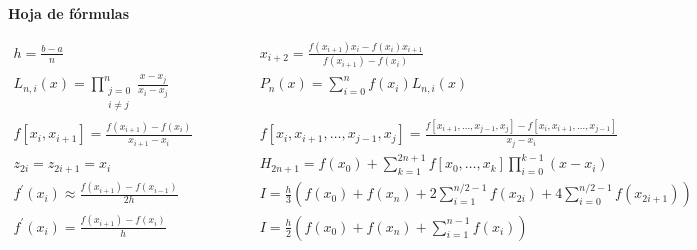 \documentclass[12pt]{article}
\begin{document}
\begin{center}
\textbf{Hoja de fórmulas}
\end{center}
{\large
\[
\begin{array}{cc}
h = \frac{b - a}{n} \qquad & \qquad
x_{i+2} = \frac{f(x_{i+1}){x_i}-f(x_{i}){x_{i+1}}}{f(x_{i+1}) - f(x_i)} \\
L_{n, i}(x) = \prod\limits_{\substack{j=0\\ i \neq j}}^n \frac{x - x_j}{x_i - x_j} \qquad & \qquad
P_n(x) = \sum\limits_{i = 0}^n f(x_i)L_{n,i}(x) \\
f\left[x_i, x_{i+1}\right] = \frac{f(x_{i+1})-f(x_i)}{x_{i+1}-x_i} \qquad & \qquad
f\left[ x_i, x_{i+1}, \ldots, x_{j-1}, x_j\right] = \frac{f\left[x_{i+1}, \ldots, x_{j-1}, x_j\right] - f\left[ x_i, x_{i+1}, \ldots, x_{j-1} \right]}{x_j - x_i} \\
z_{2i} = z_{2i+1} = x_i \qquad & \qquad
H_{2n+1} = f(x_0) + \sum\limits_{k=1}^{2n+1} f\left[x_0, \ldots, x_k\right] \prod\limits_{i = 0}^{k-1}(x-x_i)  \\
f^\prime(x_i) \approx \frac{f(x_{i+1}) - f(x_{i-1})}{2h} \qquad & \qquad
I = \frac{h}{3}\left( f(x_0) + f(x_n) + 2\sum\limits_{i=1}^{n/2-1}f(x_{2i}) + 4\sum\limits_{i=0}^{n/2-1}f(x_{2i+1}) \right) \\
f^\prime(x_i) = \frac{f(x_{i+1})-f(x_i)}{h} \qquad & \qquad
I = \frac{h}{2}\left( f(x_0) + f(x_n) + \sum\limits_{i = 1}^{n-1}f(x_i)\right)
\end{array}
\]
}
\end{document}

